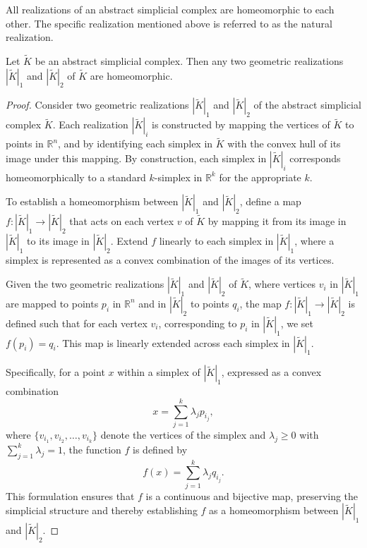 All realizations of an abstract simplicial complex are homeomorphic to each other. The specific realization mentioned above is referred to as the natural realization.

\begin{proposition}
	Let $\tilde{K}$ be an abstract simplicial complex. Then any two geometric realizations $|\tilde{K}|_1$ and $|\tilde{K}|_2$ of $\tilde{K}$ are homeomorphic.
\end{proposition}

\begin{proof}
    Consider two geometric realizations $|\tilde{K}|_1$ and $|\tilde{K}|_2$ of the abstract simplicial complex $\tilde{K}$. Each realization $|\tilde{K}|_i$ is constructed by mapping the vertices of $\tilde{K}$ to points in $\mathbb{R}^{n}$, and by identifying each simplex in $\tilde{K}$ with the convex hull of its image under this mapping. By construction, each simplex in $|\tilde{K}|_i$ corresponds homeomorphically to a standard $k$-simplex in $\mathbb{R}^{k}$ for the appropriate $k$.

    To establish a homeomorphism between $|\tilde{K}|_1$ and $|\tilde{K}|_2$, define a map $f: |\tilde{K}|_1 \to |\tilde{K}|_2$ that acts on each vertex $v$ of $\tilde{K}$ by mapping it from its image in $|\tilde{K}|_1$ to its image in $|\tilde{K}|_2$. Extend $f$ linearly to each simplex in $|\tilde{K}|_1$, where a simplex is represented as a convex combination of the images of its vertices.

    Given the two geometric realizations $|\tilde{K}|_1$ and $|\tilde{K}|_2$ of $\tilde{K}$, where vertices $v_i$ in $|\tilde{K}|_1$ are mapped to points $p_i$ in $\mathbb{R}^{n}$ and in $|\tilde{K}|_2$ to points $q_i$, the map $f: |\tilde{K}|_1 \to |\tilde{K}|_2$ is defined such that for each vertex $v_i$, corresponding to $p_i$ in $|\tilde{K}|_1$, we set $f(p_i) = q_i$. This map is linearly extended across each simplex in $|\tilde{K}|_1$.

    Specifically, for a point $x$ within a simplex of $|\tilde{K}|_1$, expressed as a convex combination
    \[
        x = \sum_{j=1}^{k} \lambda_j p_{i_j},
    \]
    where $\{v_{i_1}, v_{i_2}, \ldots, v_{i_k}\}$ denote the vertices of the simplex and $\lambda_j \geq 0$ with $\sum_{j=1}^{k} \lambda_j = 1$, the function $f$ is defined by
    \[
        f(x) = \sum_{j=1}^{k} \lambda_j q_{i_j}.
    \]
    This formulation ensures that $f$ is a continuous and bijective map, preserving the simplicial structure and thereby establishing $f$ as a homeomorphism between $|\tilde{K}|_1$ and $|\tilde{K}|_2$.


\end{proof}
